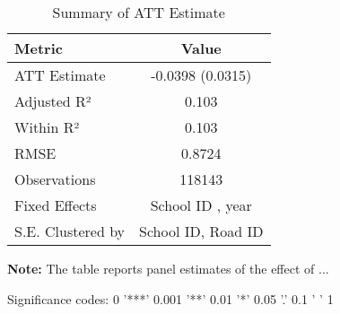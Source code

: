 \begin{table}[H]
\centering
\caption{Summary of ATT Estimate}
\label{tab:SA_reading_0p}
 \begin{center}
 \begin{tabular}{lc}
 \toprule
Metric & Value \\
\midrule
ATT Estimate & -0.0398 (0.0315) \\
\hline 
 Adjusted R² & 0.103 \\
Within R² & 0.103 \\
RMSE & 0.8724 \\
Observations & 118143 \\
\hline 
 Fixed Effects & School ID ,  year \\
S.E. Clustered by & School ID, Road ID \\
\bottomrule
\end{tabular}
 \end{center}\begin{tablenotes}
\small
\item \textbf{Note:} The table reports panel estimates of the effect of ...
\item Significance codes: 0 '***' 0.001 '**' 0.01 '*' 0.05 '.' 0.1 ' ' 1
\end{tablenotes}
\end{table}